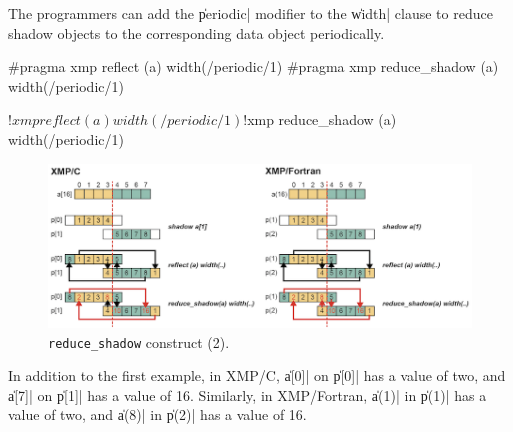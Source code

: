 The programmers can add the \|periodic| modifier to the \|width| clause
to reduce shadow objects to the corresponding data object periodically.

\begin{XCexample}
#pragma xmp reflect (a) width(/periodic/1)
#pragma xmp reduce_shadow (a) width(/periodic/1)
\end{XCexample}

\begin{XFexample}
!$xmp reflect (a) width(/periodic/1)
!$xmp reduce_shadow (a) width(/periodic/1)
\end{XFexample}

\begin{figure}
  \centering
  \includegraphics[width=\textwidth]{figs/reduce_shadow_periodic.png}
  \caption{{\tt reduce\_shadow} construct (2).}
\end{figure}

In addition to the first example, in XMP/C, \|a[0]| on \|p[0]| has a
value of two, and \|a[7]| on \|p[1]| has a value of 16. Similarly, in
XMP/Fortran, \|a(1)| in \|p(1)| has a value of two, and \|a(8)| in
\|p(2)| has a value of 16.